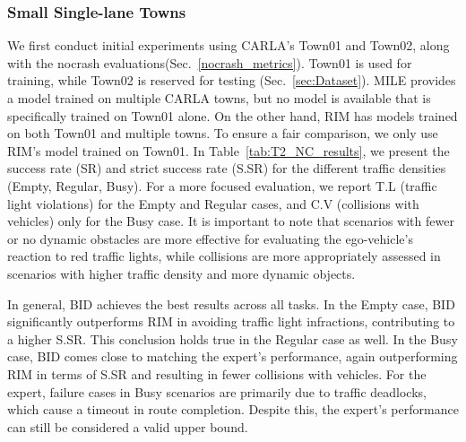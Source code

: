 \subsubsection{Small Single-lane Towns} \label{sec:small_town_results}

\hspace{1pc}We first conduct initial experiments using CARLA's Town01 and Town02, along with the nocrash evaluations(Sec.~\ref{nocrash_metrics}). 
Town01 is used for training, while Town02 is reserved for testing (Sec.~\ref{sec:Dataset}). 
MILE provides a model trained on multiple CARLA towns, but no model is available that is specifically trained on Town01 alone. 
On the other hand, RIM has models trained on both Town01 and multiple towns. To ensure a fair comparison, we only use RIM’s model trained on Town01. 
In Table~\ref{tab:T2_NC_results}, we present the success rate (SR) and strict success rate (S.SR) for the different traffic densities (Empty, Regular, Busy). 
For a more focused evaluation, we report T.L (traffic light violations) for the Empty and Regular cases, and C.V (collisions with vehicles) only for the Busy case. 
It is important to note that scenarios with fewer or no dynamic obstacles are more effective for evaluating the ego-vehicle's reaction to red traffic lights, while collisions are more appropriately assessed in scenarios with higher traffic density and more dynamic objects.


In general, BID achieves the best results across all tasks. 
In the Empty case, BID significantly outperforms RIM in avoiding traffic light infractions, contributing to a higher S.SR. 
This conclusion holds true in the Regular case as well. 
In the Busy case, BID comes close to matching the expert’s performance, again outperforming RIM in terms of S.SR and resulting in fewer collisions with vehicles. 
For the expert, failure cases in Busy scenarios are primarily due to traffic deadlocks, which cause a timeout in route completion. 
Despite this, the expert's performance can still be considered a valid upper bound.


